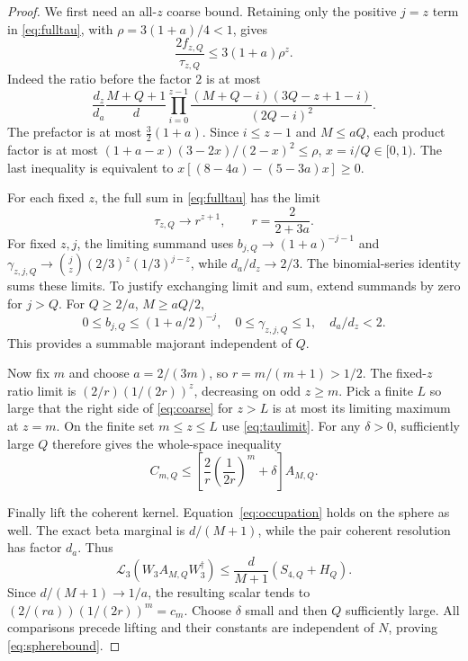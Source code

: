 \documentclass[11pt]{article}
\begin{document}
\begin{proof}
We first need an all-$z$ coarse bound. Retaining only the positive $j=z$
term in \eqref{eq:fulltau}, with $\rho=3(1+a)/4<1$, gives
\begin{equation}\label{eq:coarse}
 \frac{2f_{z,Q}}{\tau_{z,Q}}\le3(1+a)\rho^z.
\end{equation}
Indeed the ratio before the factor $2$ is at most
\begin{equation}
 \frac{d_z}{d_a}\frac{M+Q+1}{d}
 \prod_{i=0}^{z-1}
 \frac{(M+Q-i)(3Q-z+1-i)}{(2Q-i)^2}.
\end{equation}
The prefactor is at most $\tfrac32(1+a)$. Since $i\le z-1$ and $M\le aQ$,
each product factor is at most
$(1+a-x)(3-2x)/(2-x)^2\le\rho$, $x=i/Q\in[0,1)$.
The last inequality is equivalent to
$x[(8-4a)-(5-3a)x]\ge0$.

For each fixed $z$, the full sum in \eqref{eq:fulltau} has the limit
\begin{equation}\label{eq:taulimit}
 \tau_{z,Q}\longrightarrow r^{z+1},\qquad r=\frac2{2+3a}.
\end{equation}
For fixed $z,j$, the limiting summand uses
$b_{j,Q}\to(1+a)^{-j-1}$ and
$\gamma_{z,j,Q}\to\binom jz(2/3)^z(1/3)^{j-z}$,
while $d_a/d_z\to2/3$. The binomial-series identity sums these limits.
To justify exchanging limit and sum, extend summands by zero for $j>Q$.
For $Q\ge2/a$, $M\ge aQ/2$,
\begin{equation}
 0\le b_{j,Q}\le(1+a/2)^{-j},\quad
 0\le\gamma_{z,j,Q}\le1,\quad d_a/d_z<2.
\end{equation}
This provides a summable majorant independent of $Q$.

Now fix $m$ and choose $a=2/(3m)$, so $r=m/(m+1)>1/2$. The fixed-$z$ ratio
limit is $(2/r)(1/(2r))^z$, decreasing on odd $z\ge m$. Pick a finite
$L$ so large that the right side of \eqref{eq:coarse} for $z>L$ is at most
its limiting maximum at $z=m$. On the finite set $m\le z\le L$ use
\eqref{eq:taulimit}. For any $\delta>0$, sufficiently large $Q$ therefore
gives the whole-space inequality
\begin{equation}
 C_{m,Q}\le\left[\frac2r\left(\frac1{2r}\right)^m+\delta\right]A_{M,Q}.
\end{equation}

Finally lift the coherent kernel. Equation~\eqref{eq:occupation} holds on
the sphere as well. The exact beta marginal is $d/(M+1)$, while the pair
coherent resolution has factor $d_a$. Thus
\begin{equation}
 \mathcal L_3(W_3A_{M,Q}W_3^\dagger)
 \le\frac{d}{M+1}(S_{4,Q}+H_Q).
\end{equation}
Since $d/(M+1)\to1/a$, the resulting scalar tends to
$(2/(ra))(1/(2r))^m=c_m$. Choose $\delta$ small and then $Q$ sufficiently
large. All comparisons precede lifting and their constants are independent
of $N$, proving \eqref{eq:spherebound}.
\end{proof}
\end{document}
